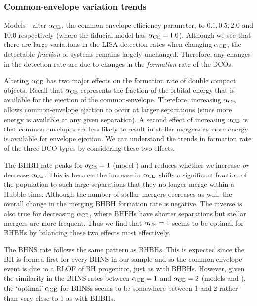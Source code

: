 \subsubsection{Common-envelope variation trends}\label{sec:detection_rate_CE_trends}

Models \modAlphaLowest{}-\modAlphaHighest{} alter $\alpha_{\rm CE}$, the common-envelope efficiency parameter, to $0.1, 0.5, 2.0$ and $10.0$ respectively (where the fiducial model has $\alpha_{\rm CE} = 1.0$). Although we see that there are large variations in the LISA detection rates when changing $\alpha_{\rm CE}$, the detectable \textit{fraction} of systems remains largely unchanged. Therefore, any changes in the detection rate are due to changes in the \textit{formation} rate of the DCOs.

Altering $\alpha_{\rm CE}$ has two major effects on the formation rate of double compact objects. Recall that $\alpha_{\rm CE}$ represents the fraction of the orbital energy that is available for the ejection of the common-envelope. Therefore, increasing $\alpha_{\rm CE}$ allows common-envelope ejection to occur at larger separations (since more energy is available at any given separation). A second effect of increasing $\alpha_{\rm CE}$ is that common-envelopes are less likely to result in stellar mergers as more energy is available for envelope ejection. We can understand the trends in formation rate of the three DCO types by considering these two effects.

The BHBH rate peaks for $\alpha_{\rm CE} = 1$ (model \modFid{}) and reduces whether we increase \textit{or} decrease $\alpha_{\rm CE}$. This is because the increase in $\alpha_{\rm CE}$ shifts a significant fraction of the population to such large separations that they no longer merge within a Hubble time. Although the number of stellar mergers decreases as well, the overall change in the merging BHBH formation rate is negative. The inverse is also true for decreasing $\alpha_{\rm CE}$, where BHBHs have shorter separations but stellar mergers are more frequent. Thus we find that $\alpha_{\rm CE} = 1$ seems to be optimal for BHBHs by balancing these two effects most effectively.

The BHNS rate follows the same pattern as BHBHs. This is expected since the BH is formed first for every BHNS in our sample and so the common-envelope event is due to a RLOF of BH progenitor, just as with BHBHs. However, given the similarity in the BHNS rates between $\alpha_{\rm CE} = 1$ and $\alpha_{\rm CE} = 2$ (models \modFid{} and \modAlphaHigh{}), the `optimal' $\alpha_{\rm CE}$ for BHNSs seems to be somewhere between 1 and 2 rather than very close to 1 as with BHBHs.

